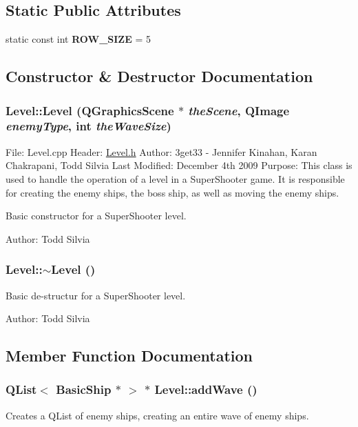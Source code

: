 \subsection*{Static Public Attributes}
\begin{DoxyCompactItemize}
\item 
\hypertarget{class_level_aae8ab47bdfd70934cc7928f69d656e1a}{
static const int {\bfseries ROW\_\-SIZE} = 5}
\label{class_level_aae8ab47bdfd70934cc7928f69d656e1a}

\end{DoxyCompactItemize}


\subsection{Constructor \& Destructor Documentation}
\hypertarget{class_level_a5c64deb4b53abe03a9a31ff1d087aaf2}{
\subsubsection[{Level}]{\setlength{\rightskip}{0pt plus 5cm}Level::Level (QGraphicsScene $\ast$ {\em theScene}, \/  QImage {\em enemyType}, \/  int {\em theWaveSize})}}
\label{class_level_a5c64deb4b53abe03a9a31ff1d087aaf2}
File: Level.cpp Header: \hyperlink{_level_8h_source}{Level.h} Author: 3get33 -\/ Jennifer Kinahan, Karan Chakrapani, Todd Silvia Last Modified: December 4th 2009 Purpose: This class is used to handle the operation of a level in a SuperShooter game. It is responsible for creating the enemy ships, the boss ship, as well as moving the enemy ships.

Basic constructor for a SuperShooter level.

Author: Todd Silvia \hypertarget{class_level_a249eac1e8f19ff44134efa5e986feaca}{
\subsubsection[{$\sim$Level}]{\setlength{\rightskip}{0pt plus 5cm}Level::$\sim$Level ()}}
\label{class_level_a249eac1e8f19ff44134efa5e986feaca}
Basic de-\/structur for a SuperShooter level.

Author: Todd Silvia 

\subsection{Member Function Documentation}
\hypertarget{class_level_a80431ecc50b0496e4fb11cda0b92905a}{
\subsubsection[{addWave}]{\setlength{\rightskip}{0pt plus 5cm}QList$<$ {\bf BasicShip} $\ast$ $>$ $\ast$ Level::addWave ()}}
\label{class_level_a80431ecc50b0496e4fb11cda0b92905a}
Creates a QList of enemy ships, creating an entire wave of enemy ships.

